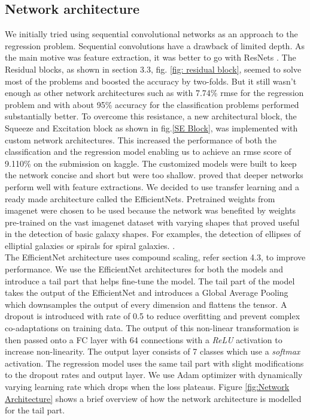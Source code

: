 \documentclass[fleqn,usenatbib]{mnras}
\begin{document}
\subsection{Network architecture}
\hspace*{0.25 in} We initially tried using sequential convolutional networks as an approach to the regression problem. Sequential convolutions have a drawback of limited depth. As the main motive was feature extraction, it was better to go with ResNets \citep{he2016}. The Residual blocks, as shown in section 3.3, fig. \ref{fig: residual block}, seemed to solve most of the problems and boosted the accuracy by two-folds. But it still wasn't enough as other network architectures such as \citet{Dieleman2015} with 7.74\% rmse for the regression problem and \citet{dai2018galaxy} with about 95\% accuracy for the classification problems performed substantially better. To overcome this resistance, a new architectural block, the Squeeze and Excitation block as shown in fig.\ref{SE Block}, was implemented with custom network architectures. This increased the performance of both the classification and the regression model enabling us to achieve an rmse score of 9.110\% on the submission on kaggle. The customized models were built to keep the network concise and short but were too shallow. \citet{he2016} proved that deeper networks perform well with feature extractions. We decided to use transfer learning and a ready made architecture called the EfficientNets. Pretrained weights from imagenet were chosen to be used because the network was benefited by weights pre-trained on the vast imagenet dataset with varying shapes that proved useful in the detection of basic galaxy shapes. For examples, the detection of ellipses of elliptial galaxies or spirals for spiral galaxies. \citep{efficientnet}.\\
\hspace*{0.25 in}The EfficientNet architecture uses compound scaling, refer section 4.3, to improve performance. We use the EfficientNet architectures for both the models and introduce a tail part that helps fine-tune the model. The tail part of the model takes the output of the EfficientNet and introduces a Global Average Pooling which downsamples the output of every dimension and flattens the tensor. A dropout is introduced with rate of 0.5 to reduce overfitting and prevent complex co-adaptations on training data. The output of this non-linear transformation is then passed onto a FC layer with 64 connections with a \textit{ReLU} activation to increase non-linearity. The output layer consists of 7 classes which use a \textit{softmax} activation. The regression model uses the same tail part with slight modifications to the dropout rates and output layer. We use Adam optimizer with dynamically varying learning rate which drops when the loss plateaus. Figure \ref{fig:Network Architecture} shows a brief overview of how the network architecture is modelled for the tail part.\\
\end{document}
